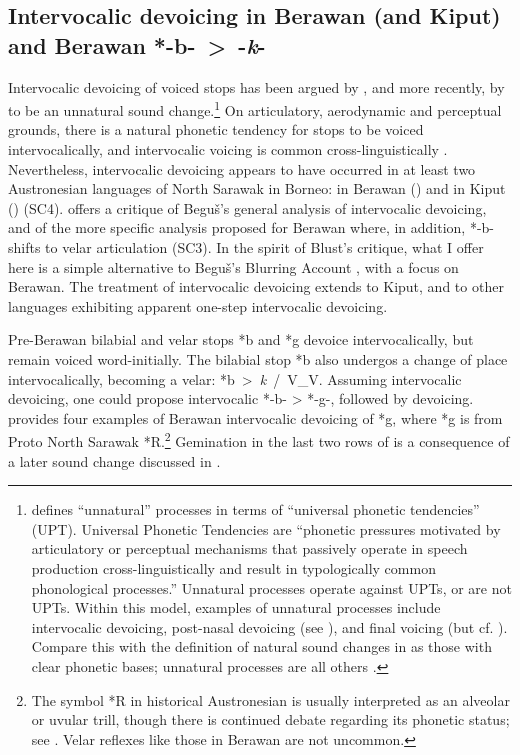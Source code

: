 \documentclass[output=paper]{langscibook}
\begin{document}
\subsection{Intervocalic devoicing in Berawan (and Kiput) and Berawan \mbox{*-b-  > -\textit{k}-}}\label{sec:blevins:2.3}
Intervocalic devoicing of voiced stops has been argued by \citet{Blust2005}, and more recently, by \citet{Beguš2018,Beguš2019} to be an unnatural sound change.\footnote{\citet[12--13]{Beguš2019} defines “unnatural” processes in terms of “universal phonetic tendencies” (UPT). Universal Phonetic Tendencies are “phonetic pressures motivated by articulatory or perceptual mechanisms that passively operate in speech production cross-linguistically and result in typologically common phonological processes.” Unnatural processes operate against UPTs, or are not UPTs. Within this model, examples of unnatural processes include intervocalic devoicing, post-nasal devoicing (see ), and final voicing (but cf. \citealt{BlevinsEtAl2020}). Compare this with the definition of natural sound changes in  as those with clear phonetic bases; unnatural processes are all others \citep{Blevins2008b}.} On articulatory, aerodynamic and perceptual grounds, there is a natural phonetic tendency for stops to be voiced intervocalically, and intervocalic voicing is common cross-linguistically \citep[21--22]{Beguš2019}. Nevertheless, intervocalic devoicing appears to have occurred in at least two Austronesian languages of North Sarawak in Borneo: in Berawan (\citealt{Blust2005, Blust2013, Burkhardt2014}) and in Kiput (\citealt{Blust2002, Blust2005}) (SC4). \citet{chapters/03_Blust} offers a critique of Beguš’s general analysis of intervocalic devoicing, and of the more specific analysis proposed for Berawan where, in addition, *-b- shifts to velar articulation (SC3). In the spirit of Blust’s critique, what I offer here is a simple alternative to Beguš’s Blurring Account \citep{Beguš2019}, with a focus on Berawan. The treatment of intervocalic devoicing extends to Kiput, and to other languages exhibiting apparent one-step intervocalic devoicing.

Pre-Berawan bilabial and velar stops *b and *g devoice intervocalically, but remain voiced word-initially. The bilabial stop *b also undergos a change of place intervocalically, becoming a velar: \mbox{*b > \textit{k} / V\_V}. Assuming intervocalic devoicing, one could propose intervocalic *-b- > *-g-, followed by devoicing.  provides four examples of Berawan intervocalic devoicing of *g, where *g is from Proto North Sarawak *R.\footnote{The symbol *R in historical Austronesian is usually interpreted as an alveolar or uvular trill, though there is continued debate regarding its phonetic status; see \citet[Chapter 8]{Blust2013}. Velar reflexes like those in Berawan are not uncommon.} Gemination in the last two rows of  is a consequence of a later sound change discussed in .
\end{document}
